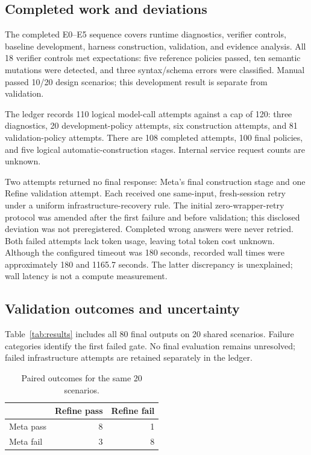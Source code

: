 \documentclass[11pt]{article}
\begin{document}
\subsection{Completed work and deviations}
The completed E0--E5 sequence covers runtime diagnostics, verifier controls, baseline development, harness construction, validation, and evidence analysis. All 18 verifier controls met expectations: five reference policies passed, ten semantic mutations were detected, and three syntax/schema errors were classified. Manual passed 10/20 design scenarios; this development result is separate from validation.

The ledger records 110 logical model-call attempts against a cap of 120: three diagnostics, 20 development-policy attempts, six construction attempts, and 81 validation-policy attempts. There are 108 completed attempts, 100 final policies, and five logical automatic-construction stages. Internal service request counts are unknown.

Two attempts returned no final response: Meta's final construction stage and one Refine validation attempt. Each received one same-input, fresh-session retry under a uniform infrastructure-recovery rule. The initial zero-wrapper-retry protocol was amended after the first failure and before validation; this disclosed deviation was not preregistered. Completed wrong answers were never retried. Both failed attempts lack token usage, leaving total token cost unknown. Although the configured timeout was 180 seconds, recorded wall times were approximately 180 and 1165.7 seconds. The latter discrepancy is unexplained; wall latency is not a compute measurement.

\subsection{Validation outcomes and uncertainty}
Table~\ref{tab:results} includes all 80 final outputs on 20 shared scenarios. Failure categories identify the first failed gate. No final evaluation remains unresolved; failed infrastructure attempts are retained separately in the ledger.

\begin{table}[t]
\centering

\caption{Validation success and failure counts. Syn.: syntax; Type: schema/type; Sem.: semantic. Each method retains all 20 scenarios.}
\label{tab:results}
\end{table}

\begin{table}[t]
\centering
\begin{tabular}{lrr}
\toprule
 & Refine pass & Refine fail \\
\midrule
Meta pass & 8 & 1 \\
Meta fail & 3 & 8 \\
\bottomrule
\end{tabular}
\caption{Paired outcomes for the same 20 scenarios.}
\label{tab:pairs}
\end{table}
\end{document}
